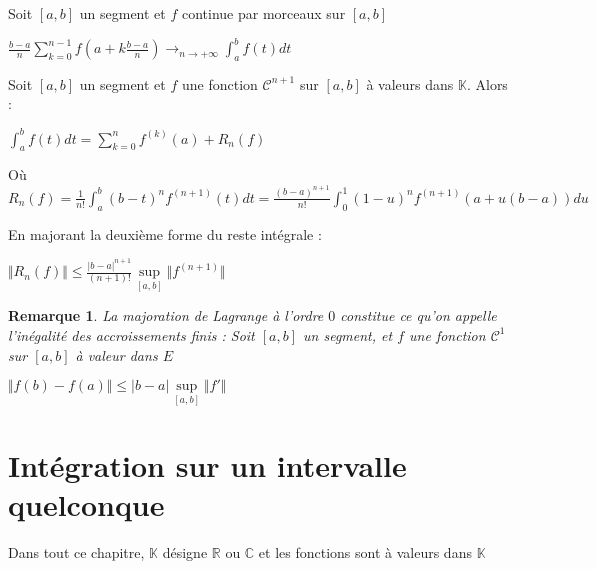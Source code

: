 \documentclass[a4paper,12pt]{book}
\newcommand{\Prop}[2]{\begin{tcolorbox}[sharp corners, colback=white,colframe=red!90!black!75, title=Proposition : #1]#2\end{tcolorbox}}
\newtheorem{Rem}{Remarque}[section]
\def\R{\mathbb{R}}
\def\C{\mathbb{C}}
\def\K{\mathbb{K}}
\begin{document}
\Prop{Sommes de Riemann régulières}{Soit $[a,b]$ un segment et $f$ continue par morceaux sur $[a,b]$\par \begin{center}$\frac{b-a}{n}\sum\limits_{k=0}^{n-1}f\left(a+k\frac{b-a}{n}\right)\to_{n\to+\infty} \int_a^bf(t)dt$\end{center}}
\Prop{formule de Taylor avec reste intégral et majoration de Lagrange}{Soit $[a,b]$ un segment et $f$ une fonction $\mathcal{C}^{n+1}$ sur $[a,b]$ à valeurs dans $\K$. Alors : \par \begin{center}$\int_a^bf(t)dt=\sum\limits_{k=0}^nf^{(k)}(a)+R_n(f)$ \end{center} \par Où $R_n(f) =\frac{1}{n!}\int_a^b(b-t)^nf^{(n+1)}(t)dt = \frac{(b-a)^{n+1}}{n!}\int_0^1(1-u)^nf^{(n+1)}(a+u(b-a))du$ \par En majorant la deuxième forme du reste intégrale : \par \begin{center} $\Vert R_n(f)\Vert \leq \frac{\vert b-a\vert^{n+1}}{(n+1)!}\sup\limits_{[a,b]}\Vert f^{(n+1)}\Vert$\end{center}}
\begin{Rem}
La majoration de Lagrange à l'ordre $0$ constitue ce qu'on appelle l'inégalité des accroissements finis : Soit $[a,b]$ un segment, et $f$ une fonction $\mathcal{C}^1$ sur $[a,b]$ à valeur dans $E$ \par\begin{center}$\Vert f(b)-f(a)\Vert \leq\vert b-a\vert\sup\limits_{[a,b]}\Vert f'\Vert$\end{center}
\end{Rem}


\section{Intégration sur un intervalle quelconque}
Dans tout ce chapitre, $\K$ désigne $\R$ ou $\C$ et les fonctions sont à valeurs dans $\K$
\end{document}
